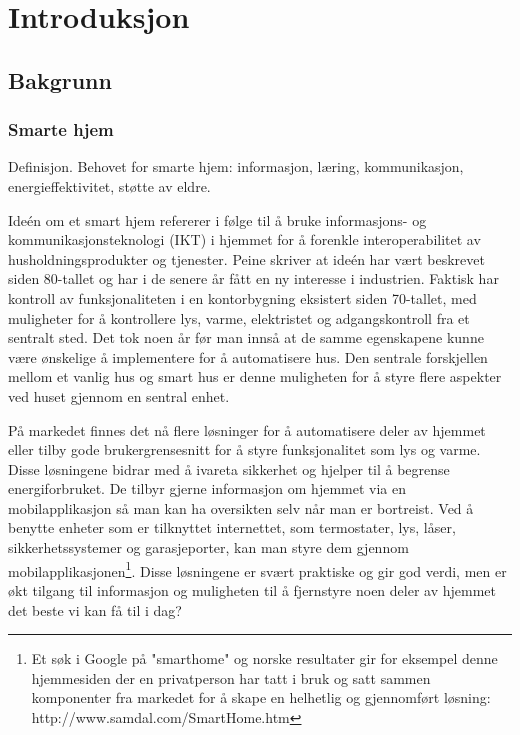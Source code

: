 \section[Introduksjon]{Introduksjon}
\subsection{Bakgrunn}

\subsubsection{Smarte hjem}
Definisjon. Behovet for smarte hjem: informasjon, læring, kommunikasjon, energieffektivitet, støtte av eldre.

Ideén om et smart hjem refererer i følge \citet{peine08} til å bruke informasjons- og kommunikasjonsteknologi (IKT) i hjemmet for å forenkle interoperabilitet av husholdningsprodukter og tjenester. Peine skriver at ideén har vært beskrevet siden 80-tallet og har i de senere år fått en ny interesse i industrien. Faktisk har kontroll av funksjonaliteten i en kontorbygning eksistert siden 70-tallet, med muligheter for å kontrollere lys, varme, elektristet og adgangskontroll fra et sentralt sted. Det tok noen år før man innså at de samme egenskapene kunne være ønskelige å implementere for å automatisere hus. Den sentrale forskjellen mellom et vanlig hus og smart hus er denne muligheten for å styre flere aspekter ved huset gjennom en sentral enhet.

På markedet finnes det nå flere løsninger for å automatisere deler av hjemmet eller tilby gode brukergrensesnitt for å styre funksjonalitet som lys og varme. Disse løsningene bidrar med å ivareta sikkerhet og hjelper til å begrense energiforbruket. De tilbyr gjerne informasjon om hjemmet via en mobilapplikasjon så man kan ha oversikten selv når man er bortreist. Ved å benytte enheter som er tilknyttet internettet, som termostater, lys, låser, sikkerhetssystemer og garasjeporter, kan man styre dem gjennom mobilapplikasjonen\footnote{Et søk i Google på "smarthome" og norske resultater gir for eksempel denne hjemmesiden der en privatperson har tatt i bruk og satt sammen komponenter fra markedet for å skape en helhetlig og gjennomført løsning: http://www.samdal.com/SmartHome.htm}. Disse løsningene er svært praktiske og gir god verdi, men er økt tilgang til informasjon og muligheten til å fjernstyre noen deler av hjemmet det beste vi kan få til i dag?

